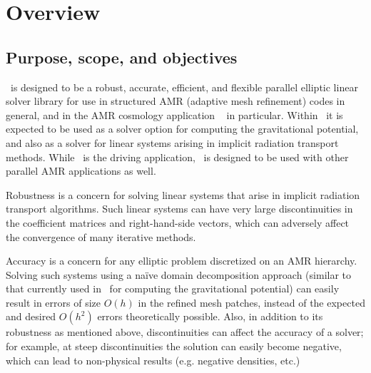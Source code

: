 \documentclass[11pt]{article}
\begin{document}

\section{Overview}

\subsection{Purpose, scope, and objectives}

\amrSolve\ is designed to be a robust, accurate, efficient, and flexible
parallel elliptic linear solver library for use in structured AMR
(adaptive mesh refinement) codes in general, and in the AMR cosmology
application \enzo~\cite{OsBr04} in particular.  Within \enzo\ it is
expected to be used as a solver option for computing the gravitational
potential, and also as a solver for linear systems arising in implicit
radiation transport methods.  While \enzo\ is the driving application,
\amrSolve\ is designed to be used with other parallel AMR applications
as well.

Robustness is a concern for solving linear systems that arise in
implicit radiation transport algorithms.  Such linear systems can have
very large discontinuities in the coefficient matrices and
right-hand-side vectors, which can adversely affect the convergence of
many iterative methods.

Accuracy is a concern for any elliptic problem discretized on an AMR
hierarchy.  Solving such systems using a na\"{i}ve domain
decomposition approach (similar to that currently used in \enzo\ for
computing the gravitational potential) can easily result in errors of
size $O(h)$ in the refined mesh patches, instead of the expected and
desired $O(h^2)$ errors theoretically possible.  Also, in addition to
its robustness as mentioned above, discontinuities can affect the
accuracy of a solver; for example, at steep discontinuities the
solution can easily become negative, which can lead to non-physical
results (e.g. negative densities, etc.)
\end{document}
